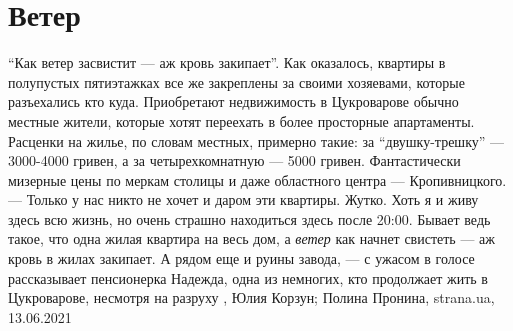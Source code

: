  
 
 
 
 
\chapter{Ветер}
\label{sec:slova.veter}

\enquote{Как ветер засвистит — аж кровь закипает}.
Как оказалось, квартиры в полупустых пятиэтажках все же закреплены за своими
хозяевами, которые разъехались кто куда. Приобретают недвижимость в Цукроварове
обычно местные жители, которые хотят переехать в более просторные апартаменты.
Расценки на жилье, по словам местных, примерно такие: за
\enquote{двушку-трешку} — 3000-4000 гривен, а за четырехкомнатную — 5000
гривен.  Фантастически мизерные цены по меркам столицы и даже областного центра
— Кропивницкого.  — Только у нас никто не хочет и даром эти квартиры. Жутко.
Хоть я и живу здесь всю жизнь, но очень страшно находиться здесь после 20:00.
Бывает ведь такое, что одна жилая квартира на весь дом, а \emph{ветер} как
начнет свистеть — аж кровь в жилах закипает. А рядом еще и руины завода, — с
ужасом в голосе рассказывает пенсионерка Надежда, одна из немногих, кто
продолжает жить в Цукроварове, несмотря на разруху
, 
Юлия Корзун; Полина Пронина, strana.ua, 13.06.2021

